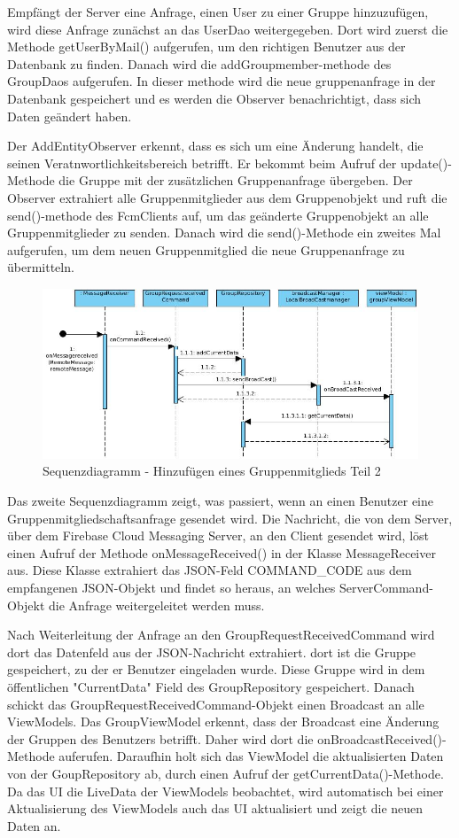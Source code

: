 Empfängt der Server eine Anfrage, einen User zu einer Gruppe hinzuzufügen, wird diese Anfrage zunächst an das UserDao weitergegeben. Dort wird zuerst die Methode getUserByMail() aufgerufen, um den richtigen Benutzer aus der Datenbank zu finden. Danach wird die addGroupmember-methode des GroupDaos aufgerufen. In dieser methode wird die neue gruppenanfrage in der Datenbank gespeichert und es werden die Observer benachrichtigt, dass sich Daten geändert haben.

Der AddEntityObserver erkennt, dass es sich um eine Änderung handelt, die seinen Veratnwortlichkeitsbereich betrifft. Er bekommt beim Aufruf der update()-Methode die Gruppe mit der zusätzlichen Gruppenanfrage übergeben. Der Observer extrahiert alle Gruppenmitglieder aus dem Gruppenobjekt und ruft die send()-methode des FcmClients auf, um das geänderte Gruppenobjekt an alle Gruppenmitglieder zu senden. Danach wird die send()-Methode ein zweites Mal aufgerufen, um dem neuen Gruppenmitglied die neue Gruppenanfrage zu übermitteln.

\begin{figure}[H]
	\centering
	\includegraphics[width=1\textwidth]{../Sequenzdiagramme/addMember2.jpg}
	\caption{Sequenzdiagramm - Hinzufügen eines Gruppenmitglieds Teil 2}
\end{figure}

Das zweite Sequenzdiagramm zeigt, was passiert, wenn an einen Benutzer eine Gruppenmitgliedschaftsanfrage gesendet wird. Die Nachricht, die von dem Server, über dem Firebase Cloud Messaging Server, an den Client gesendet wird, löst einen Aufruf der Methode onMessageReceived() in der Klasse MessageReceiver aus. Diese Klasse extrahiert das JSON-Feld COMMAND\_CODE aus dem empfangenen JSON-Objekt und findet so heraus, an welches ServerCommand-Objekt die Anfrage weitergeleitet werden muss.

Nach Weiterleitung der Anfrage an den GroupRequestReceivedCommand wird dort das Datenfeld aus der JSON-Nachricht extrahiert. dort ist die Gruppe gespeichert, zu der er Benutzer eingeladen wurde. Diese Gruppe wird in dem öffentlichen "CurrentData" Field des GroupRepository gespeichert. Danach schickt das GroupRequestReceivedCommand-Objekt einen Broadcast an alle ViewModels. Das GroupViewModel erkennt, dass der Broadcast eine Änderung der Gruppen des Benutzers betrifft. Daher wird dort die onBroadcastReceived()-Methode auferufen. Daraufhin holt sich das ViewModel die aktualisierten Daten von der GoupRepository ab, durch einen Aufruf der getCurrentData()-Methode. Da das UI die LiveData der ViewModels beobachtet, wird automatisch bei einer Aktualisierung des ViewModels auch das UI aktualisiert und zeigt die neuen Daten an.


